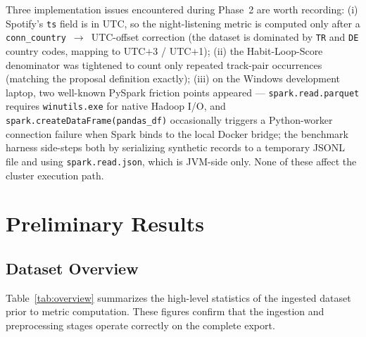 \documentclass[conference]{IEEEtran}
\begin{document}
Three implementation issues encountered during Phase~2 are worth recording: (i) Spotify's \texttt{ts} field is in UTC, so the night-listening metric is computed only after a \texttt{conn\_country}~$\rightarrow$~UTC-offset correction (the dataset is dominated by \texttt{TR} and \texttt{DE} country codes, mapping to UTC$+$3 / UTC$+$1); (ii) the Habit-Loop-Score denominator was tightened to count only repeated track-pair occurrences (matching the proposal definition exactly); (iii) on the Windows development laptop, two well-known PySpark friction points appeared --- \texttt{spark.read.parquet} requires \texttt{winutils.exe} for native Hadoop I/O, and \texttt{spark.createDataFrame(pandas\_df)} occasionally triggers a Python-worker connection failure when Spark binds to the local Docker bridge; the benchmark harness side-steps both by serializing synthetic records to a temporary JSONL file and using \texttt{spark.read.json}, which is JVM-side only. None of these affect the cluster execution path.

\section{Preliminary Results}

\subsection{Dataset Overview}

Table~\ref{tab:overview} summarizes the high-level statistics of the ingested dataset prior to metric computation. These figures confirm that the ingestion and preprocessing stages operate correctly on the complete export.
\end{document}
